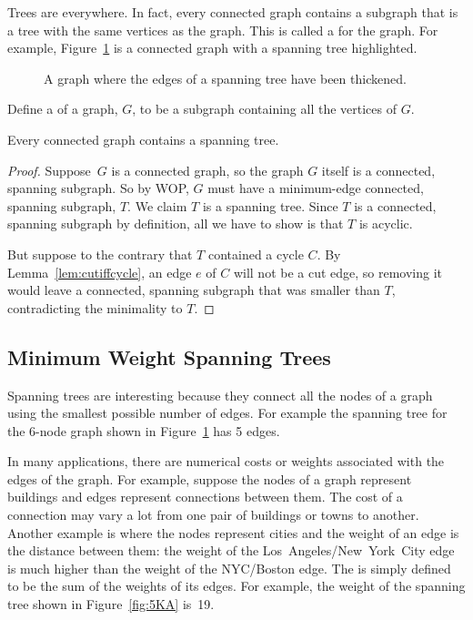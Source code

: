 Trees are everywhere.  In fact, every connected graph contains a
subgraph that is a tree with the same vertices as the graph.  This is
called a  for the graph.  For example,
Figure~\ref{fig:5LL} is a connected graph with a spanning tree
highlighted.

\begin{figure}


\caption{A graph where the edges of a spanning tree have been
  thickened.}

\label{fig:5LL}

\end{figure}

\begin{definition}
Define a  of a graph, $G$, to be a subgraph
containing all the vertices of $G$.
\end{definition}

\begin{theorem}\label{th:spantree}
Every connected graph contains a spanning tree.
\end{theorem}

\begin{proof}
Suppose~$G$ is a connected graph, so the graph $G$ itself is a
connected, spanning subgraph.  So by WOP, $G$ must have a minimum-edge
connected, spanning subgraph, $T$.  We claim $T$ is a spanning tree.
Since $T$ is a connected, spanning subgraph by definition, all we have
to show is that $T$ is acyclic.

But suppose to the contrary that $T$ contained a cycle $C$.  By
Lemma~\ref{lem:cutiffcycle}, an edge $e$ of $C$ will not be a cut
edge, so removing it would leave a connected, spanning subgraph that
was smaller than $T$, contradicting the minimality to $T$.
\end{proof}

\subsection{Minimum Weight Spanning Trees}\label{MST_subsec}

Spanning trees are interesting because they connect all the nodes of a
graph using the smallest possible number of edges.  For example the
spanning tree for the 6-node graph shown in Figure~\ref{fig:5LL} has 5
edges.

In many applications, there are numerical costs or weights associated
with the edges of the graph.  For example, suppose the nodes of a
graph represent buildings and edges represent connections between
them.  The cost of a connection may vary a lot from one pair of
buildings or towns to another.  Another example is where the nodes
represent cities and the weight of an edge is the distance between
them: the weight of the Los~Angeles/New~York~City edge is much higher
than the weight of the NYC/Boston edge.  The  is
simply defined to be the sum of the weights of its edges.  For
example, the weight of the spanning tree shown in Figure~\ref{fig:5KA}
is~19.

